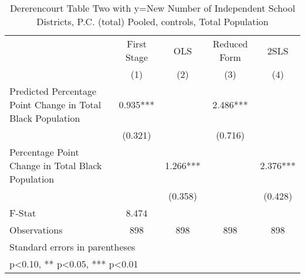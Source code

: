 \begin{table}[htbp]\centering
\def\sym#1{\ifmmode^{#1}\else\(^{#1}\)\fi}
\caption{Dererencourt Table Two with y=New Number of Independent School Districts, P.C. (total)  Pooled,  controls, Total Population}
\begin{tabular}{l*{4}{c}}
\toprule
                    & First Stage   &         OLS   &Reduced Form   &        2SLS   \\
                    &\multicolumn{1}{c}{(1)}   &\multicolumn{1}{c}{(2)}   &\multicolumn{1}{c}{(3)}   &\multicolumn{1}{c}{(4)}   \\
\midrule
Predicted Percentage Point Change in Total Black Population&       0.935***&               &       2.486***&               \\
                    &     (0.321)   &               &     (0.716)   &               \\
\addlinespace
Percentage Point Change in Total Black Population&               &       1.266***&               &       2.376***\\
                    &               &     (0.358)   &               &     (0.428)   \\
\midrule
F-Stat              &       8.474   &               &               &               \\
Observations        &         898   &         898   &         898   &         898   \\
\bottomrule
\multicolumn{5}{l}{\footnotesize Standard errors in parentheses}\\
\multicolumn{5}{l}{\footnotesize * p<0.10, ** p<0.05, *** p<0.01}\\
\end{tabular}
\end{table}
